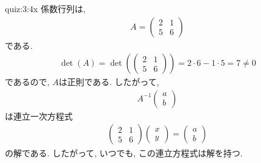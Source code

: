 \begin{answerof}{quiz:3:4x}
  係数行列は,
  \begin{align*}
    A=\begin{pmatrix}2&1\\5&6\end{pmatrix}
  \end{align*}
  である.
  \begin{align*}
    \det(A)=\det(\begin{pmatrix}2&1\\5&6\end{pmatrix})=2\cdot6-1\cdot 5=7\neq 0
  \end{align*}
  であるので, $A$は正則である.
  したがって,
  \begin{align*}
      A^{-1}\begin{pmatrix}a\\b\end{pmatrix}
  \end{align*}
  は連立一次方程式
  \begin{align*}
    \begin{pmatrix}2&1\\5&6\end{pmatrix}
    \begin{pmatrix}x\\y\end{pmatrix}
      =
      \begin{pmatrix}a\\b\end{pmatrix}
  \end{align*}
  の解である.
  したがって,
  いつでも,
  この連立方程式は解を持つ.
\end{answerof}

 

